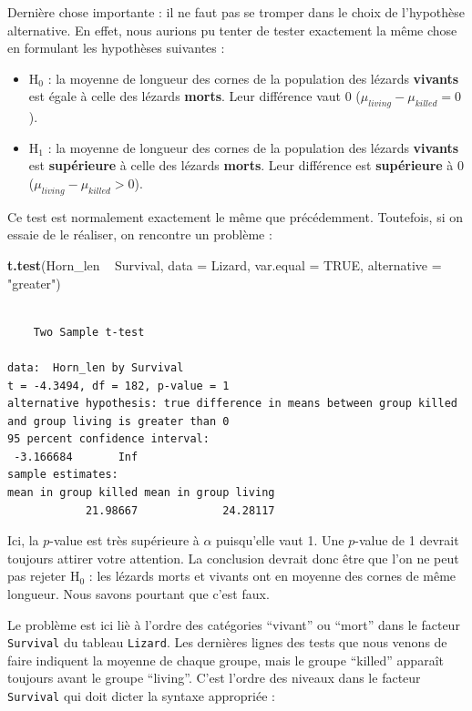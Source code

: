 \documentclass[
  a4paper,
]{article}
\newenvironment{Shaded}{\begin{snugshade}}{\end{snugshade}}
\newcommand{\DataTypeTok}[1]{\textcolor[rgb]{0.00,0.34,0.68}{#1}}
\newcommand{\KeywordTok}[1]{\textcolor[rgb]{0.12,0.11,0.11}{\textbf{#1}}}
\newcommand{\NormalTok}[1]{\textcolor[rgb]{0.12,0.11,0.11}{#1}}
\newcommand{\OperatorTok}[1]{\textcolor[rgb]{0.12,0.11,0.11}{#1}}
\newcommand{\OtherTok}[1]{\textcolor[rgb]{0.00,0.43,0.16}{#1}}
\newcommand{\StringTok}[1]{\textcolor[rgb]{0.75,0.01,0.01}{#1}}
\providecommand{\tightlist}{%
  \setlength{\itemsep}{0pt}\setlength{\parskip}{0pt}}
\begin{document}
Dernière chose importante : il ne faut pas se tromper dans le choix de l'hypothèse alternative. En effet, nous aurions pu tenter de tester exactement la même chose en formulant les hypothèses suivantes :

\begin{itemize}
\tightlist
\item
  H\(_0\) : la moyenne de longueur des cornes de la population des lézards \textbf{vivants} est égale à celle des lézards \textbf{morts}. Leur différence vaut 0 (\(\mu_{living}-\mu_{killed} = 0\)).
\item
  H\(_1\) : la moyenne de longueur des cornes de la population des lézards \textbf{vivants} est \textbf{supérieure} à celle des lézards \textbf{morts}. Leur différence est \textbf{supérieure} à 0 (\(\mu_{living}-\mu_{killed} > 0\)).
\end{itemize}

Ce test est normalement exactement le même que précédemment. Toutefois, si on essaie de le réaliser, on rencontre un problème :

\begin{Shaded}
\begin{Highlighting}[]
\KeywordTok{t.test}\NormalTok{(Horn_len }\OperatorTok{~}\StringTok{ }\NormalTok{Survival, }
       \DataTypeTok{data =}\NormalTok{ Lizard, }\DataTypeTok{var.equal =} \OtherTok{TRUE}\NormalTok{,}
       \DataTypeTok{alternative =} \StringTok{"greater"}\NormalTok{)}
\end{Highlighting}
\end{Shaded}

\begin{verbatim}

    Two Sample t-test

data:  Horn_len by Survival
t = -4.3494, df = 182, p-value = 1
alternative hypothesis: true difference in means between group killed and group living is greater than 0
95 percent confidence interval:
 -3.166684       Inf
sample estimates:
mean in group killed mean in group living 
            21.98667             24.28117 
\end{verbatim}

Ici, la \(p\)-value est très supérieure à \(\alpha\) puisqu'elle vaut 1. Une \(p\)-value de 1 devrait toujours attirer votre attention. La conclusion devrait donc être que l'on ne peut pas rejeter H\(_0\) : les lézards morts et vivants ont en moyenne des cornes de même longueur. Nous savons pourtant que c'est faux.

Le problème est ici liè à l'ordre des catégories ``vivant'' ou ``mort'' dans le facteur \texttt{Survival} du tableau \texttt{Lizard}. Les dernières lignes des tests que nous venons de faire indiquent la moyenne de chaque groupe, mais le groupe ``killed'' apparaît toujours avant le groupe ``living''. C'est l'ordre des niveaux dans le facteur \texttt{Survival} qui doit dicter la syntaxe appropriée :
\end{document}
